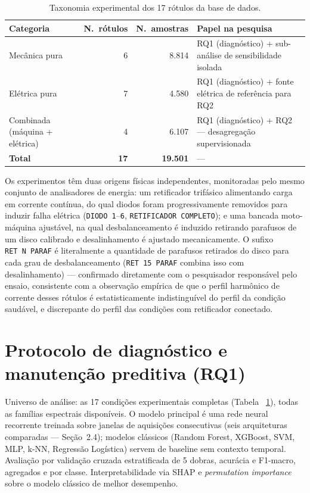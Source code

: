 \documentclass[12pt,a4paper]{report}
\begin{document}
\begin{table}[H]
\centering
\caption{Taxonomia experimental dos 17 rótulos da base de dados.}
\label{tab:taxonomia}
\begin{tabular}{@{}lrrl@{}}
\toprule
\textbf{Categoria} & \textbf{N.\ rótulos} & \textbf{N.\ amostras} & \textbf{Papel na pesquisa} \\
\midrule
Mecânica pura & 6 & 8.814 & RQ1 (diagnóstico) + sub-análise de sensibilidade isolada \\
Elétrica pura & 7 & 4.580 & RQ1 (diagnóstico) + fonte elétrica de referência para RQ2 \\
Combinada (máquina + elétrica) & 4 & 6.107 & RQ1 (diagnóstico) + RQ2 — desagregação supervisionada \\
\midrule
\textbf{Total} & \textbf{17} & \textbf{19.501} & --- \\
\bottomrule
\end{tabular}
\end{table}

\noindent Os experimentos têm duas origens físicas independentes, monitoradas
pelo mesmo conjunto de analisadores de energia: um retificador trifásico
alimentando carga em corrente contínua, do qual diodos foram progressivamente
removidos para induzir falha elétrica (\texttt{DIODO~1}--\texttt{6},
\texttt{RETIFICADOR COMPLETO}); e uma bancada moto-máquina ajustável, na qual
desbalanceamento é induzido retirando parafusos de um disco calibrado e
desalinhamento é ajustado mecanicamente. O sufixo \texttt{RET~N~PARAF} é
literalmente a quantidade de parafusos retirados do disco para cada grau de
desbalanceamento (\texttt{RET~15~PARAF} combina isso com desalinhamento) —
confirmado diretamente com o pesquisador responsável pelo ensaio, consistente
com a observação empírica de que o perfil harmônico de corrente desses
rótulos é estatisticamente indistinguível do perfil da condição saudável, e
discrepante do perfil das condições com retificador conectado.

\section{Protocolo de diagnóstico e manutenção preditiva (RQ1)}
\label{sec:protocolo-diagnostico}

Universo de análise: as 17 condições experimentais completas (Tabela~
\ref{tab:taxonomia}), todas as famílias espectrais disponíveis. O modelo
principal é uma rede neural recorrente treinada sobre janelas de aquisições
consecutivas (seis arquiteturas comparadas — Seção~2.4); modelos clássicos
(Random Forest, XGBoost, SVM, MLP, k-NN, Regressão Logística) servem de
baseline sem contexto temporal. Avaliação por validação cruzada estratificada
de 5 dobras, acurácia e F1-macro, agregados e por classe. Interpretabilidade
via SHAP e \emph{permutation importance} sobre o modelo clássico de melhor
desempenho.
\end{document}
